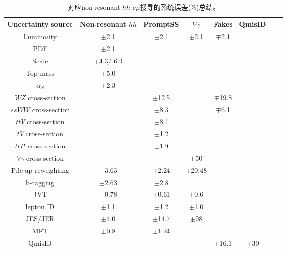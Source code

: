\begin{table}[h]
\begin{center}
\begin{tabular}{c|ccc|cccc}
\hline
Uncertainty source  &Non-resonant $hh$  &PromptSS &$V\gamma$ &Fakes &QmisID\\
\hline
Luminosity &$\pm$2.1 &$\pm$2.1 &$\pm$2.1 &$\mp$2.1  &\multirow{ 16}{*}{}\\
\hline
PDF  &$\pm$2.1  &   & &\multirow{ 3}{*}{}\\
Scale &+4.3/-6.0 & & &\\
Top mass &$\pm$5.0 & & &\\
$\alpha_S$ &$\pm$2.3 & & &\\
\hline
$WZ$ cross-section  & &$\pm$12.5 & &$\mp$19.8\\
$ssWW$ cross-section & &$\pm$8.3 & &$\mp$6.1\\
$ttV$ cross-section & &$\pm$8.1 & &\\
$tV$ cross-section & &$\pm$1.2 &  &\\
$ttH$ cross-section & &$\pm$1.9 & & \\
$V\gamma$ cross-section & & &$\pm$50 &\\
\hline
Pile-up reweighting &$\pm$3.63 &$\pm$2.24 &$\pm$20.48 &\multirow{ 5}{*}{}\\
b-tagging &$\pm$2.63 &$\pm$2.8 & &\\
JVT &$\pm$0.78 &$\pm$0.61  &$\pm$0.6 &\\
lepton ID &$\pm$1.1 &$\pm$1.2 &$\pm$1.0 &\\
\cline{1-4}
JES/JER &$\pm$4.0 & $\pm$14.7 &$\pm$98 &\\
\cline{1-4}
MET &$\pm$0.8 &$\pm$1.24 & &\\
\hline
QmisID &  &  &  &$\mp$16.1 &$\pm$30\\
\hline
\end{tabular}
\caption{对应non-resonant $hh$ $e\mu$搜寻的系统误差(\%)总结。}
\label{tab:summary_syst_ee_nonres}
\end{center}
\end{table}
